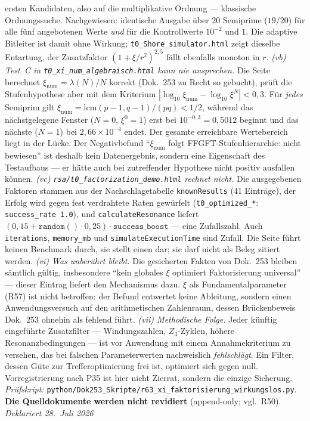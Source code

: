 ersten Kandidaten, also auf die multiplikative Ordnung --- klassische   Ordnungssuche. Nachgewiesen: identische Ausgabe \"uber 20 Semiprime   ($19/20$) f\"ur alle f\"unf angebotenen Werte \emph{und} f\"ur die   Kontrollwerte $10^{-2}$ und $1$. Die adaptive Bitleiter ist damit ohne   Wirkung; \texttt{t0\_Shore\_simulator.html} zeigt dieselbe Entartung, der   Zusatzfaktor $(1+\xi/r^2)^{2{,}5}$ f\"allt ebenfalls monoton in $r$.   \emph{(vb) Test~C in \texttt{t0\_xi\_num\_algebraisch.html} kann nie   ansprechen.} Die Seite berechnet $\xi_\text{num} = \lambda(N)/N$ korrekt   (Dok.~253 zu Recht so gebucht), pr\"uft die Stufenhypothese aber mit dem   Kriterium $|\log_{10}\xi_\text{num} - \log_{10}\xi^N| < 0{,}3$. F\"ur   \emph{jedes} Semiprim gilt $\xi_\text{num} = \mathrm{lcm}(p-1,q-1)/(pq)   < 1/2$, w\"ahrend das n\"achstgelegene Fenster ($N=0$, $\xi^0 = 1$) erst   bei $10^{-0{,}3} = 0{,}5012$ beginnt und das n\"achste ($N=1$) bei   $2{,}66\times10^{-4}$ endet. Der gesamte erreichbare Wertebereich liegt   in der L\"ucke. Der Negativbefund \enquote{$\xi_\text{num}$ folgt   FFGFT-Stufenhierarchie: nicht bewiesen} ist deshalb kein Datenergebnis,   sondern eine Eigenschaft des Testaufbaus --- er h\"atte auch bei   zutreffender Hypothese nicht positiv ausfallen k\"onnen.   \emph{(vc) \texttt{rsa/t0\_factorization\_demo.html} rechnet nicht.}   Die ausgegebenen Faktoren stammen aus der Nachschlagetabelle   \texttt{knownResults} (41 Eintr\"age), der Erfolg wird gegen fest   verdrahtete Raten gew\"urfelt (\texttt{t0\_optimized\_*}:   \texttt{success\_rate 1.0}), und \texttt{calculateResonance} liefert   $(0{,}15 + \texttt{random}()\cdot 0{,}25)\cdot\texttt{success\_boost}$ ---   eine Zufallszahl. Auch \texttt{iterations}, \texttt{memory\_mb} und   \texttt{simulateExecutionTime} sind Zufall. Die Seite f\"uhrt keinen   Benchmark durch, sie stellt einen dar; sie darf nicht als Beleg zitiert   werden.   \emph{(vi) Was unberührt bleibt.} Die gesicherten Fakten von Dok.~253   bleiben sämtlich gültig, insbesondere \enquote{kein globales $\xi$   optimiert Faktorisierung universal} --- dieser Eintrag liefert den   Mechanismus dazu. $\xi$ als Fundamentalparameter (R57) ist nicht   betroffen: der Befund entwertet keine Ableitung, sondern einen   Anwendungsversuch auf den arithmetischen Zahlenraum, dessen   Brückenbeweis Dok.~253 ohnehin als fehlend führt.   \emph{(vii) Methodische Folge.} Jeder künftig eingeführte   Zusatzfilter --- Windungszahlen, $Z_3$-Zyklen, höhere   Resonanzbedingungen --- ist vor Anwendung mit einem Annahmekriterium   zu versehen, das bei falschen Parameterwerten nachweislich   \emph{fehlschlägt}. Ein Filter, dessen Güte zur Trefferoptimierung frei   ist, optimiert sich gegen null. Vorregistrierung nach P35 ist hier   nicht Zierrat, sondern die einzige Sicherung.   \emph{Prüfskript:}   \texttt{python/\allowbreak Dok253\_\allowbreak Skripte/\allowbreak r63\_\allowbreak xi\_\allowbreak faktorisierung\_\allowbreak wirkungslos.py}.   \textbf{Die Quelldokumente werden nicht revidiert}   (append-only; vgl.\ R50). \emph{Deklariert 28.~Juli 2026}

